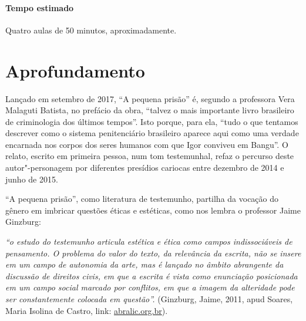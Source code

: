 \documentclass[11pt]{extarticle}
\begin{document}
\paragraph{Tempo estimado} Quatro aulas de 50 minutos, aproximadamente.


\section{Aprofundamento}

Lançado em setembro de 2017, ``A pequena prisão'' é, segundo a
professora Vera Malaguti Batista, no prefácio da obra, ``talvez o mais
importante livro brasileiro de criminologia dos últimos tempos''. Isto
porque, para ela, ``tudo o que tentamos descrever como o sistema
penitenciário brasileiro aparece aqui como uma verdade encarnada nos
corpos dos seres humanos com que Igor conviveu em Bangu''. O relato,
escrito em primeira pessoa, num tom testemunhal, refaz o percurso deste
autor"-personagem por diferentes presídios cariocas entre dezembro de
2014 e junho de 2015.


``A pequena prisão'', como literatura de testemunho, partilha da vocação
do gênero em imbricar questões éticas e estéticas, como nos lembra o
professor Jaime Ginzburg:

\emph{``o estudo do testemunho articula estética e ética como campos
indissociáveis de pensamento. O problema do valor do texto, da
relevância da escrita, não se insere em um campo de autonomia da arte,
mas é lançado no âmbito abrangente da discussão de direitos civis, em
que a escrita é vista como enunciação posicionada em um campo social
marcado por conflitos, em que a imagem da alteridade pode ser
constantemente colocada em questão''.} (Ginzburg, Jaime, 2011, apud
Soares, Maria Isolina de Castro, link:
\href{https://abralic.org.br/anais/arquivos/2018\_1547730007.pdf}{abralic.org.br}).
\end{document}
